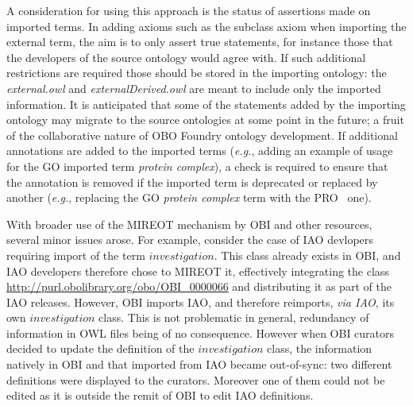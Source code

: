 \documentclass{ao2e}%
\begin{document}
A consideration for using this approach is the status of assertions made on imported terms.
In adding axioms such as the subclass axiom when importing the external term, the aim is to only assert true statements, for instance those that the developers of the source ontology would agree with.
If such additional restrictions are required those should be stored in the importing ontology: the \emph{external.owl} and \emph{externalDerived.owl} are meant to include only the imported information.
It is anticipated that some of the statements added by the importing ontology may migrate to the source ontologies at some point in the future; a fruit of the collaborative nature of OBO Foundry ontology development. %
If additional annotations are added to the imported terms (\emph{e.g.}, adding an example of usage for the \ac{GO} imported term \textit{protein complex}), a check is required to ensure that the annotation is removed if the imported term is deprecated or replaced by another (\emph{e.g.}, replacing  the \ac{GO} \textit{protein complex} term with the \ac{PRO}~\cite{PRO} one).

With broader use of the MIREOT mechanism by OBI and other resources, several minor issues arose.
For example, consider the case of \ac{IAO} devlopers requiring import of the term $investigation$.  This class already exists in \ac{OBI}, and \ac{IAO} developers therefore chose to MIREOT it, effectively integrating the class \url{http://purl.obolibrary.org/obo/OBI_0000066} and distributing it as part of the \ac{IAO} releases.
However, \ac{OBI} imports \ac{IAO}, and therefore reimports, \emph{via IAO}, its own $investigation$ class. This is not problematic in general, redundancy of information in OWL files being of no consequence. However when \ac{OBI} curators decided to update the definition of the $investigation$ class, the information natively in \ac{OBI} and that imported from \ac{IAO} became out-of-sync: two different definitions were displayed to the curators. Moreover one of them could not be edited as it is outside the remit of OBI to edit IAO definitions.
\end{document}
